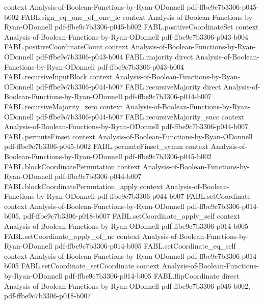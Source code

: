 \begin{theorem}
  {context}
  {Analysis-of-Boolean-Functions-by-Ryan-ODonnell}
  {pdf-ffbe9c7b3306-p045-b002}
\proofstep
  {FABL.sign_eq_one_of_one_le}
  {context}
  {Analysis-of-Boolean-Functions-by-Ryan-ODonnell}
  {pdf-ffbe9c7b3306-p045-b002}
\proofstep
  {FABL.positiveCoordinateSet}
  {context}
  {Analysis-of-Boolean-Functions-by-Ryan-ODonnell}
  {pdf-ffbe9c7b3306-p043-b004}
\proofstep
  {FABL.positiveCoordinateCount}
  {context}
  {Analysis-of-Boolean-Functions-by-Ryan-ODonnell}
  {pdf-ffbe9c7b3306-p043-b004}
\proofstep
  {FABL.majority}
  {direct}
  {Analysis-of-Boolean-Functions-by-Ryan-ODonnell}
  {pdf-ffbe9c7b3306-p043-b004}
\proofstep
  {FABL.recursiveInputBlock}
  {context}
  {Analysis-of-Boolean-Functions-by-Ryan-ODonnell}
  {pdf-ffbe9c7b3306-p044-b007}
\proofstep
  {FABL.recursiveMajority}
  {direct}
  {Analysis-of-Boolean-Functions-by-Ryan-ODonnell}
  {pdf-ffbe9c7b3306-p044-b007}
\proofstep
  {FABL.recursiveMajority_zero}
  {context}
  {Analysis-of-Boolean-Functions-by-Ryan-ODonnell}
  {pdf-ffbe9c7b3306-p044-b007}
\proofstep
  {FABL.recursiveMajority_succ}
  {context}
  {Analysis-of-Boolean-Functions-by-Ryan-ODonnell}
  {pdf-ffbe9c7b3306-p044-b007}
\proofstep
  {FABL.permuteFinset}
  {context}
  {Analysis-of-Boolean-Functions-by-Ryan-ODonnell}
  {pdf-ffbe9c7b3306-p045-b002}
\proofstep
  {FABL.permuteFinset_symm}
  {context}
  {Analysis-of-Boolean-Functions-by-Ryan-ODonnell}
  {pdf-ffbe9c7b3306-p045-b002}
\proofstep
  {FABL.blockCoordinatePermutation}
  {context}
  {Analysis-of-Boolean-Functions-by-Ryan-ODonnell}
  {pdf-ffbe9c7b3306-p044-b007}
\proofstep
  {FABL.blockCoordinatePermutation_apply}
  {context}
  {Analysis-of-Boolean-Functions-by-Ryan-ODonnell}
  {pdf-ffbe9c7b3306-p044-b007}
\proofstep
  {FABL.setCoordinate}
  {context}
  {Analysis-of-Boolean-Functions-by-Ryan-ODonnell}
  {pdf-ffbe9c7b3306-p014-b005,
    pdf-ffbe9c7b3306-p018-b007}
\proofstep
  {FABL.setCoordinate_apply_self}
  {context}
  {Analysis-of-Boolean-Functions-by-Ryan-ODonnell}
  {pdf-ffbe9c7b3306-p014-b005}
\proofstep
  {FABL.setCoordinate_apply_of_ne}
  {context}
  {Analysis-of-Boolean-Functions-by-Ryan-ODonnell}
  {pdf-ffbe9c7b3306-p014-b005}
\proofstep
  {FABL.setCoordinate_eq_self}
  {context}
  {Analysis-of-Boolean-Functions-by-Ryan-ODonnell}
  {pdf-ffbe9c7b3306-p014-b005}
\proofstep
  {FABL.setCoordinate_setCoordinate}
  {context}
  {Analysis-of-Boolean-Functions-by-Ryan-ODonnell}
  {pdf-ffbe9c7b3306-p014-b005}
\proofstep
  {FABL.flipCoordinate}
  {direct}
  {Analysis-of-Boolean-Functions-by-Ryan-ODonnell}
  {pdf-ffbe9c7b3306-p046-b002,
    pdf-ffbe9c7b3306-p018-b007}
\proofstep

\end{theorem}
